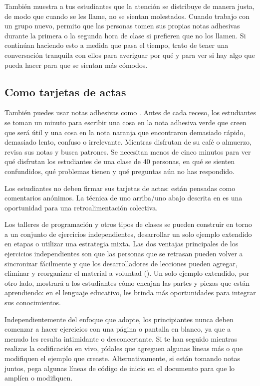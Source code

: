 También muestra a tus estudiantes que la atención se distribuye de manera justa,
de modo que cuando se les llame,
no se sientan molestados.
Cuando trabajo con un grupo nuevo,
permito que las personas tomen sus propias notas adhesivas
durante la primera o la segunda hora de clase
si prefieren que no los llamen.
Si continúan haciendo esto a medida que pasa el tiempo,
trato de tener una conversación tranquila con ellos para averiguar por qué
y para ver si hay algo que pueda hacer para que se sientan más cómodos.

\subsection*{Como tarjetas de actas}

También puedes usar notas adhesivas como .
Antes de cada receso,
los estudiantes se toman un minuto para escribir una cosa en la nota adhesiva verde
que creen que será útil
y una cosa en la nota naranja
que encontraron demasiado rápido,
demasiado lento,
confuso
o irrelevante.
Mientras disfrutan de su café o almuerzo,
revisa sus notas y busca patrones.
Se necesitan menos de cinco minutos para ver qué disfrutan los estudiantes de una clase de 40 personas,
en qué se sienten confundidos,
qué problemas tienen
y qué preguntas aún no has respondido.

Los estudiantes no deben firmar sus tarjetas de actas:
están pensadas como comentarios anónimos.
La técnica de uno arriba/uno abajo descrita en 
es una oportunidad para una retroalimentación colectiva.


Los talleres de programación y otros tipos de clases
se pueden construir en torno a un conjunto de ejercicios independientes,
desarrollar un solo ejemplo extendido en etapas
o utilizar una estrategia mixta.
Las dos ventajas principales de los ejercicios independientes son que
las personas que se retrasan pueden volver a sincronizar fácilmente
y que los desarrolladores de lecciones pueden agregar, eliminar y reorganizar el material a voluntad
().
Un solo ejemplo extendido,
por otro lado,
mostrará a los estudiantes cómo encajan las partes y piezas que están aprendiendo:
en el lenguaje educativo,
les brinda más oportunidades para integrar sus conocimientos.

Independientemente del enfoque que adopte,
los principiantes nunca deben comenzar a hacer ejercicios con una página o pantalla en blanco,
ya que a menudo les resulta intimidante o desconcertante.
Si te han seguido mientras realizas la codificación en vivo,
pídales que agreguen algunas líneas más
o que modifiquen el ejemplo que creaste.
Alternativamente, si están tomando notas juntos,
pega algunas líneas de código de inicio en el documento
para que lo amplíen o modifiquen.

